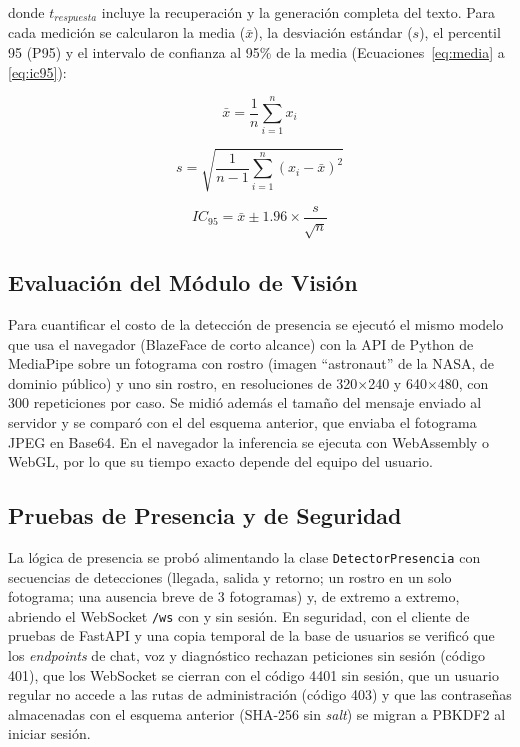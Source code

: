 donde $t_{respuesta}$ incluye la recuperación y la generación completa del texto. Para cada medición se calcularon la media ($\bar{x}$), la desviación estándar ($s$), el percentil 95 (P95) y el intervalo de confianza al 95\% de la media (Ecuaciones~\ref{eq:media} a \ref{eq:ic95}):

\begin{equation}
\label{eq:media}
\bar{x} = \frac{1}{n} \sum_{i=1}^{n} x_i
\end{equation}

\begin{equation}
\label{eq:desv}
s = \sqrt{\frac{1}{n-1} \sum_{i=1}^{n} (x_i - \bar{x})^2}
\end{equation}

\begin{equation}
\label{eq:ic95}
IC_{95} = \bar{x} \pm 1.96 \times \frac{s}{\sqrt{n}}
\end{equation}

\subsection{Evaluación del Módulo de Visión}
Para cuantificar el costo de la detección de presencia se ejecutó el mismo modelo que usa el navegador (BlazeFace de corto alcance) con la API de Python de MediaPipe sobre un fotograma con rostro (imagen ``astronaut'' de la NASA, de dominio público) y uno sin rostro, en resoluciones de 320$\times$240 y 640$\times$480, con 300 repeticiones por caso. Se midió además el tamaño del mensaje enviado al servidor y se comparó con el del esquema anterior, que enviaba el fotograma JPEG en Base64. En el navegador la inferencia se ejecuta con WebAssembly o WebGL, por lo que su tiempo exacto depende del equipo del usuario.

\subsection{Pruebas de Presencia y de Seguridad}
La lógica de presencia se probó alimentando la clase \texttt{Detector\allowbreak{}Presencia} con secuencias de detecciones (llegada, salida y retorno; un rostro en un solo fotograma; una ausencia breve de 3 fotogramas) y, de extremo a extremo, abriendo el WebSocket \texttt{/ws} con y sin sesión. En seguridad, con el cliente de pruebas de FastAPI y una copia temporal de la base de usuarios se verificó que los \textit{endpoints} de chat, voz y diagnóstico rechazan peticiones sin sesión (código 401), que los WebSocket se cierran con el código 4401 sin sesión, que un usuario regular no accede a las rutas de administración (código 403) y que las contraseñas almacenadas con el esquema anterior (SHA-256 sin \textit{salt}) se migran a PBKDF2 al iniciar sesión.

